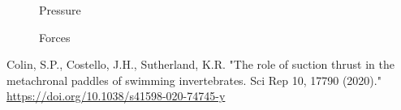 \documentclass[12pt]{article}
\begin{document}
\begin{figure}[h]
\begin{minipage}{0.33\textwidth}
  \caption{Pressure}
  \label{Pressure}
\end{minipage}
\begin{minipage}{0.33\textwidth}
  \centering\vspace{3mm}
  \caption{Forces}
  \label{Forces}
\end{minipage}
\end{figure}
\begin{thebibliography}{1}
\bibitem{} 
Colin, S.P., Costello, J.H., Sutherland, K.R. "The role of suction thrust in the metachronal paddles of swimming invertebrates. Sci Rep 10, 17790 (2020)."
\\ \url{https://doi.org/10.1038/s41598-020-74745-y}
\end{thebibliography}
\end{document}

